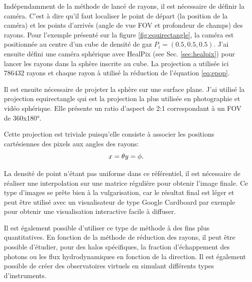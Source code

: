 Indépendamment de la méthode de lancé de rayons, il est nécessaire de définir la caméra.
C'est à dire qu'il faut localiser le point de départ (la position de la caméra) et les points d'arrivés (angle de vue \ac{FOV} et profondeur de champs) des rayons.
Pour l'exemple présenté sur la figure \ref{fig:equirectangle}, la caméra est positionnée au centre d'un cube de densité de gaz $P_i = (0.5,0.5,0.5)$.
J'ai ensuite défini une caméra sphérique avec HealPix (see Sec. \ref{sec:healpix}) pour lancer les rayons dans la sphère inscrite au cube.
La projection a utilisée ici $786432$ rayons et chaque rayon à utilisé la réduction de l'équation \ref{eq:epop}.

Il est ensuite nécessaire de projeter la sphère sur une surface plane.
J'ai utilisé la projection equirectangle qui est la projection la plus utilisée en photographie et vidéo sphérique.
Elle présente un ratio d'aspect de 2:1 correspondant à un \ac{FOV} de 360x180°.

Cette projection est triviale puisqu'elle consiste à associer les positions cartésiennes des pixels aux angles des rayons:
\begin{equation}
x=\theta\\
y=\phi.
\end{equation}

La densité de point n’étant pas uniforme dans ce référentiel, il est nécessaire de réaliser une interpolation sur une matrice régulière pour obtenir l'image finale.
Ce type d'images se prête bien à la vulgarisation, car le résultat final est léger et peut être utilisé avec un visualisateur de type Google Cardboard par exemple pour obtenir une visualisation interactive facile à diffuser.

Il est également possible d'utiliser ce type de méthode à des fins plus quantitatives.
En fonction de la méthode de réduction des rayons, il peut être possible d'étudier, pour des halos spécifiques, la fraction d'échappement des photons ou les flux hydrodynamiques en fonction de la direction. 
Il est également possible de créer des observatoires virtuels en simulant différents types d'instruments.

